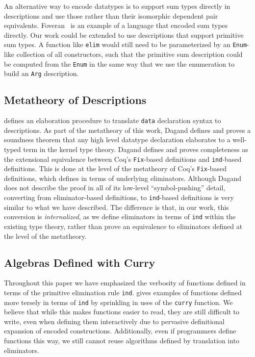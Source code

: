 \documentclass[preprint,nonatbib]{sigplanconf}
\begin{document}
An alternative way to encode datatypes is to
support sum types directly in descriptions and use those rather than
their isomorphic dependent pair equivalents. Foveran~\citep{foveran} is
an example of a language that encoded sum types directly. Our work
could be extended to use descriptions that support primitive sum
types. A function like {\tt elim} would still need to be parameterized
by an {\tt Enum}-like collection of all constructors, such that the
primitive sum description could be computed from the {\tt Enum} in the
same way that we use the enumeration to build an {\tt Arg}
description.

\subsection{Metatheory of Descriptions}

\citet{dagand:phd} defines an elaboration procedure to translate
{\tt data} declaration syntax to descriptions. As part of the
metatheory of this work, Dagand defines and proves a soundness theorem
that any high level datatype declaration elaborates to a well-typed
term in the kernel type theory. Dagand defines and proves completeness as the
extensional equivalence between {\sc Coq}'s {\tt Fix}-based
definitions and {\tt ind}-based definitions. This is done at the level
of the metatheory of {\sc Coq}'s {\tt Fix}-based definitions, which
\citet{gimenez1995codifying} defines in terms of underlying
eliminators. Although Dagand does not describe the proof in all of its
low-level ``symbol-pushing'' detail, converting from
eliminator-based definitions, to {\tt ind}-based definitions is very similar
to what we have described. The difference is that, in our work, this
conversion is {\it internalized}, as we define eliminators in terms of
{\tt ind} within the existing type theory, rather than prove an
equivalence to eliminators defined at the level of the metatheory.

\subsection{Algebras Defined with Curry}

Throughout this paper we have emphasized the verbosity of functions
defined in terms of the primitive elimination rule {\tt ind}.
\citet{mcbride2010ornamental} gives examples of functions defined more
tersely in terms of {\tt ind} by sprinkling in uses of the {\tt curry}
function. We believe that while this makes functions easier to
read, they are still difficult to write, even when defining them
interactively due to pervasive definitional expansion of encoded
constructions. Additionally, even if programmers define functions this
way, we still cannot reuse algorithms defined by translation into
eliminators.
\end{document}
